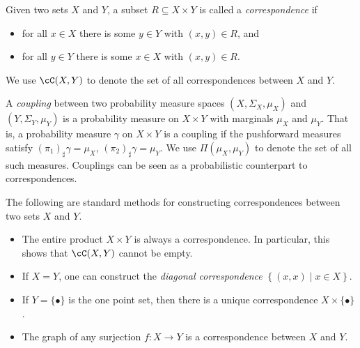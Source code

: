 \documentclass[twoside,11pt]{article}
\newcommand{\set}[2]{\left\{ #1\middle| #2\right\}}
\begin{document}
Given two sets $X$ and $Y$, a subset $R\subseteq X\times Y$ is called a \emph{correspondence} if

\begin{itemize}
  \item 
  for all $x\in X$ there is some $y\in Y$ with $(x, y)\in R$, and
  \item for all $y\in Y$ there is some $x\in X$ with $(x, y)\in R$.
\end{itemize}
We use $\cC(X,Y)$ to denote the set of all correspondences between $X$ and $Y$. 

A \emph{coupling} between two probability measure spaces $(X,\Sigma_X,\mu_X)$ and $(Y,\Sigma_Y,\mu_Y)$ is a probability measure on $X\times Y$ with marginals $\mu_X$ and $\mu_Y$. That is, a probability measure $\gamma$ on $X\times Y$ is a coupling if the pushforward measures satisfy $(\pi_1)_\sharp \gamma = \mu_X$, $(\pi_2)_\sharp \gamma = \mu_Y$. We use $\Pi(\mu_X,\mu_Y)$ to denote the set of all such measures. Couplings can be seen as a probabilistic counterpart to correspondences.

The following are standard methods for constructing correspondences between two sets $X$ and $Y$.
\begin{itemize}
    \item The entire product $X\times Y$ is always a correspondence. In particular, this shows that $\cC(X,Y)$ cannot be empty. 
    

    
\item If $X=Y$, one can construct the \emph{diagonal correspondence} $\set{(x,x)}{x\in X}$.

\item If $Y=\{\bullet\}$ is the one point set, then there is a unique correspondence $X\times \{\bullet\}$.
    \item The graph of any surjection $f:X\to Y$ is a correspondence between $X$ and $Y$.
\end{itemize}
\end{document}
